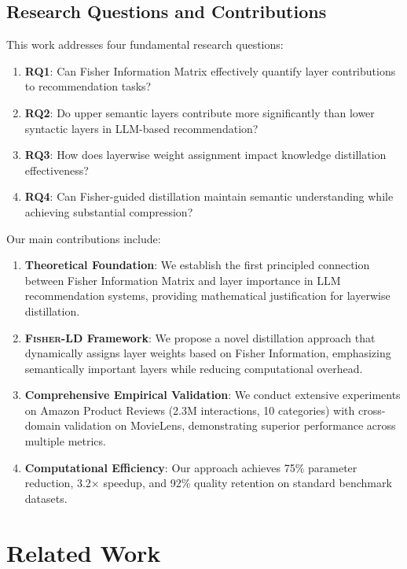 \documentclass[10pt,conference]{IEEEtran}
\newcommand{\fisherld}{\textsc{Fisher-LD}}
\begin{document}
\subsection{Research Questions and Contributions}

This work addresses four fundamental research questions:

\begin{enumerate}[leftmargin=*]
    \item \textbf{RQ1}: Can Fisher Information Matrix effectively quantify layer contributions to recommendation tasks?
    \item \textbf{RQ2}: Do upper semantic layers contribute more significantly than lower syntactic layers in LLM-based recommendation?
    \item \textbf{RQ3}: How does layerwise weight assignment impact knowledge distillation effectiveness?
    \item \textbf{RQ4}: Can Fisher-guided distillation maintain semantic understanding while achieving substantial compression?
\end{enumerate}

Our main contributions include:

\begin{enumerate}[leftmargin=*]
    \item \textbf{Theoretical Foundation}: We establish the first principled connection between Fisher Information Matrix and layer importance in LLM recommendation systems, providing mathematical justification for layerwise distillation.
    
    \item \textbf{\fisherld{} Framework}: We propose a novel distillation approach that dynamically assigns layer weights based on Fisher Information, emphasizing semantically important layers while reducing computational overhead.
    
    \item \textbf{Comprehensive Empirical Validation}: We conduct extensive experiments on Amazon Product Reviews (2.3M interactions, 10 categories) with cross-domain validation on MovieLens, demonstrating superior performance across multiple metrics.
    
    \item \textbf{Computational Efficiency}: Our approach achieves 75\% parameter reduction, 3.2× speedup, and 92\% quality retention on standard benchmark datasets.
\end{enumerate}

\section{Related Work}
\end{document}
